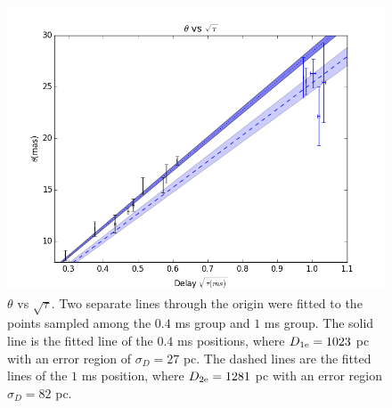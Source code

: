 \documentclass[useAMS,usenatbib]{mn2e}
\begin{document}
\begin{figure}
\centering
\includegraphics[width=1.0\linewidth, angle=0]{Theta_tau.png}
\caption{${\theta}$ vs ${\sqrt{\tau}}$. Two separate lines through the
  origin were fitted to the points sampled among the $0.4$ ms group
  and $1$ ms group. The solid line is the fitted line of the $0.4$ ms
  positions, where $D_{1\rm e}=1023$ pc with an error region of
  $\sigma_D=27$ pc. The dashed lines are the fitted lines of the $1$ ms
  position, where $D_{2\rm e}=1281$ pc with an error region
  $\sigma_D=82$ pc.
}
\label{thetatau}
\end{figure}
\end{document}
